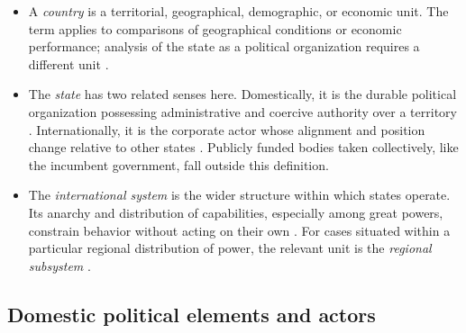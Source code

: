 \documentclass[11pt]{article}
\begin{document}
\begin{itemize}
	\item A \emph{country} is a territorial, geographical, demographic, or economic unit. The term applies to comparisons of geographical conditions or economic performance; analysis of the state as a political organization requires a different unit \parencite{linz_stepan_1996,waltz_1979}.
	\item The \emph{state} has two related senses here. Domestically, it is the durable political organization possessing administrative and coercive authority over a territory \parencite{weber1922wirtschaft,hobbes1651leviathan}. Internationally, it is the corporate actor whose alignment and position change relative to other states \parencite{waltz_1979,mearsheimer_2001}. Publicly funded bodies taken collectively, like the incumbent government, fall outside this definition.
	\item The \emph{international system} is the wider structure within which states operate. Its anarchy and distribution of capabilities, especially among great powers, constrain behavior without acting on their own \parencite{waltz_1979,mearsheimer_2001}. For cases situated within a particular regional distribution of power, the relevant unit is the \emph{regional subsystem} \parencite{buzan_waever_2003}.
\end{itemize}

\subsection{Domestic political elements and actors}
\end{document}
